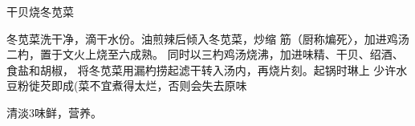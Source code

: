 \begin{recipe}{干贝烧冬苋菜}

\ingredients


\cooking

冬苋菜洗干净，滴干水份。油煎辣后倾入冬苋菜，炒缩 筋（厨称煸死〉，加进鸡汤二杓，置于文火上烧至六成熟。 同时以三杓鸡汤烧沸，加进味精、干贝、绍酒、食盐和胡椒， 将冬苋菜用漏杓捞起滤干转入汤内，再烧片刻。起锅时琳上 少许水豆粉徙芡即成(菜不宜煮得太烂，否则会失去原味

\notes

清淡3味鲜，营养。

\end{recipe}

